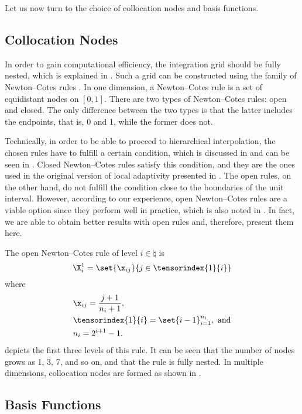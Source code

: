Let us now turn to the choice of collocation nodes and basis functions.

\subsection{Collocation Nodes}

In order to gain computational efficiency, the integration grid should be fully
nested, which is explained in . Such a grid can be
constructed using the family of Newton--Cotes rules \cite{ma2009}. In one
dimension, a Newton--Cotes rule is a set of equidistant nodes on $[0, 1]$. There
are two types of Newton--Cotes rules: open and closed. The only difference
between the two types is that the latter includes the endpoints, that is, 0 and
1, while the former does not.

Technically, in order to be able to proceed to hierarchical interpolation, the
chosen rules have to fulfill a certain condition, which is discussed in
 and can be seen in
. Closed Newton--Cotes rules satisfy this
condition, and they are the ones used in the original version of local
adaptivity presented in \cite{ma2009}. The open rules, on the other hand, do not
fulfill the condition close to the boundaries of the unit interval. However,
according to our experience, open Newton--Cotes rules are a viable option since
they perform well in practice, which is also noted in \cite{klimke2006}. In
fact, we are able to obtain better results with open rules and, therefore,
present them here.

The open Newton--Cotes rule of level $i \in \natural$ is
\[
  \X^1_i = \set{\x_{ij}}{j \in \tensorindex{1}{i}}
\]
where
\begin{align*}
  & \x_{ij} = \frac{j + 1}{n_i + 1}, \\
  & \tensorindex{1}{i} = \set{i - 1}_{i = 1}^{n_i}, \text{ and} \\
  & n_i = 2^{i + 1} - 1.
\end{align*}
 depicts the first three levels of this rule. It can be seen
that the number of nodes grows as 1, 3, 7, and so on, and that the rule is fully
nested. In multiple dimensions, collocation nodes are formed as shown in
.

\subsection{Basis Functions}


